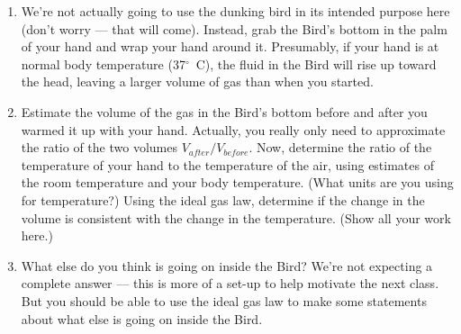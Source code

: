 \begin{exercise}
  \begin{enumerate}
  \item We're not actually going to use the dunking bird in its
    intended purpose here (don't worry --- that will come).  Instead,
    grab the Bird's bottom in the palm of your hand and wrap your hand
    around it.  Presumably, if your hand is at normal body temperature
    (37$^\circ$~C), the fluid in the Bird will rise up toward the
    head, leaving a larger volume of gas than when you started.

  \item Estimate the volume of the gas in the Bird's bottom before and
    after you warmed it up with your hand.  Actually, you really only
    need to approximate the ratio of the two volumes 
    $V_{ after}/V_{ before}$.  Now, determine the ratio of the 
    temperature of your hand to the temperature of the air, using estimates 
    of the room temperature and your body temperature.  (What
    units are you using for temperature?)  Using the ideal gas law,
    determine if the change in the volume is consistent with the
    change in the temperature.  (Show all your work here.)

  \item What else do you think is going on inside the Bird?  We're not
    expecting a complete answer --- this is more of a set-up to help
    motivate the next class.  But you should be able to use the ideal
    gas law to make some statements about what else is going on inside
    the Bird.
  \end{enumerate}
  \label{prob:birdI}
\end{exercise}

